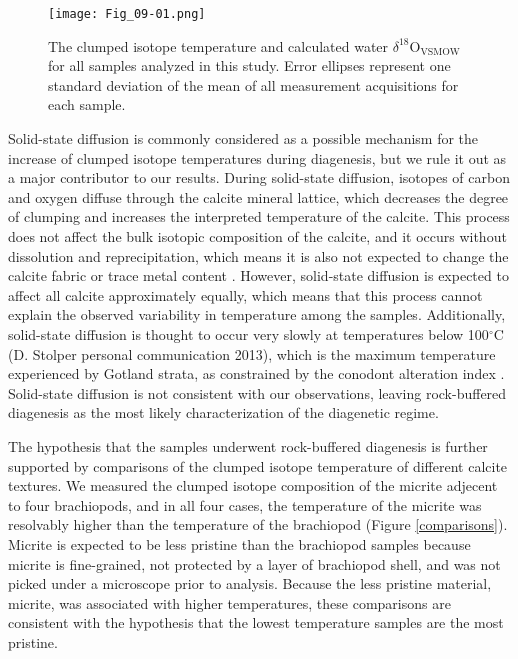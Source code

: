 \documentclass[5p, authoryear]{elsarticle}
\newcommand{\deltao}{$\delta^{18}$}
\newcommand{\degrees}{$^{\circ}$}
\begin{document}
\begin{figure}[h]
\centering
\texttt{[image: Fig\_09-01.png]}
\caption{The clumped isotope temperature and calculated water \deltao O$_{\text{VSMOW}}$ for all samples analyzed in this study. Error ellipses represent one standard deviation of the mean of all measurement acquisitions for each sample.}
\label{ellipses}
\end{figure}

Solid-state diffusion is commonly considered as a possible mechanism for the increase of clumped isotope temperatures during diagenesis, but we rule it out as a major contributor to our results. During solid-state diffusion, isotopes of carbon and oxygen diffuse through the calcite mineral lattice, which decreases the degree of clumping and increases the interpreted temperature of the calcite. This process does not affect the bulk isotopic composition of the calcite, and it occurs without dissolution and reprecipitation, which means it is also not expected to change the calcite fabric or trace metal content \citep{Eiler2011}. However, solid-state diffusion is expected to affect all calcite approximately equally, which means that this process cannot explain the observed variability in temperature among the samples. Additionally, solid-state diffusion is thought to occur very slowly at temperatures below 100\degrees C (D. Stolper personal communication 2013), which is the maximum temperature experienced by Gotland strata, as constrained by the conodont alteration index \citep{Jeppsson1983,Wenzel2000}. Solid-state diffusion is not consistent with our observations, leaving rock-buffered diagenesis as the most likely characterization of the diagenetic regime.

The hypothesis that the samples underwent rock-buffered diagenesis is further supported by comparisons of the clumped isotope temperature of different calcite textures. We measured the clumped isotope composition of the micrite adjecent to four brachiopods, and in all four cases, the temperature of the micrite was resolvably higher than the temperature of the brachiopod (Figure \ref{comparisons}). Micrite is expected to be less pristine than the brachiopod samples because micrite is fine-grained, not protected by a layer of brachiopod shell, and was not picked under a microscope prior to analysis. Because the less pristine material, micrite, was associated with higher temperatures, these comparisons are consistent with the hypothesis that the lowest temperature samples are the most pristine.
\end{document}
